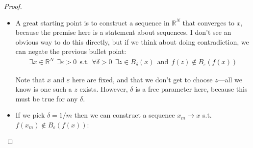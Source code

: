 \documentclass{article}
\begin{document}
\begin{proof}
\begin{enumerate}[1.]
\begin{itemize}[label=$\bullet$]
        \item A great starting point is to construct a sequence in $\mathbb{R}^N$ that converges to $x$, because the premise here is a statement about sequences. I don't see an obvious way to do this directly, but if we think about doing contradiction, we can negate the previous bullet point:
          \begin{align*}
            \exists x \in \mathbb{R}^N
            ~~
            \exists \varepsilon > 0
            ~~\text{s.t.}~~
            \forall \delta > 0
            ~~
            \exists z \in B_{\delta}(x)
            ~~\text{and}~~
            f(z) \notin B_{\varepsilon}(f(x))
          \end{align*}

          Note that $x$ and $\varepsilon$ here are fixed, and that we don't get to choose $z$---all we know is one such a $z$ exists. However, $\delta$ is a free parameter here, because this must be true for any $\delta$.

        \item If we pick $\delta = 1/m$ then we can construct a sequence $x_m \to x$ s.t. $f(x_m) \notin B_{\varepsilon}(f(x))$:
        \begin{figure}[H]
          \centering
\end{figure}
\end{itemize}
\end{enumerate}
\end{proof}
\end{document}

